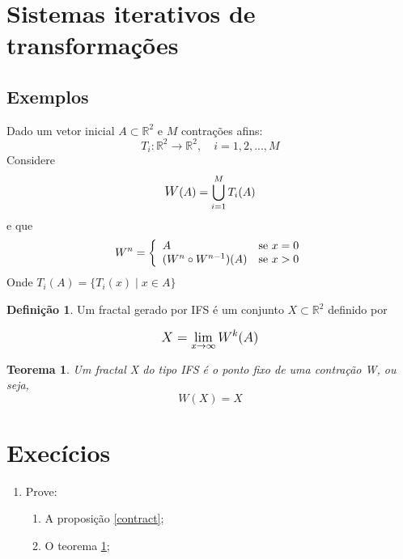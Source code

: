 \documentclass[12pt]{report}
\newtheorem{theorem}{Teorema}
\theoremstyle{definition}
\newtheorem{definition}{Definição}
\begin{document}
\section{Sistemas iterativos de transformações}

\subsection{Exemplos}

Dado um vetor inicial \( A \subset \mathbb{R}^2 \) e \( M \) contrações afins:
\[ 
    T_i: \mathbb{R}^2 \longrightarrow \mathbb{R}^2, \quad i = 1,2,...,M 
\]
Considere
\begin{equation}
    \mathlarger W(A) = \bigcup_{i = 1}^{M} T_i(A)
\end{equation}
e que
\begin{equation}
    W^n =
    \left\{
    	\begin{array}{l l}
    		 A                         & \mbox{se } x = 0 \\
    		 (W^{n} \circ W^{n-1})(A)  & \mbox{se } x > 0
    	\end{array}
    \right.
\end{equation}
Onde \( T_i(A) = \{ T_i(x) \mid x \in A \} \)
\begin{definition}

Um fractal gerado por IFS é um conjunto \( X \subset  \mathbb{R}^2 \) definido por 

\[ 
    \mathlarger{
        X = \lim_{x \rightarrow{\infty}} W^k(A)
    }  
\]

\end{definition}

\begin{theorem}\label{idenpotent}
Um fractal X do tipo IFS é o ponto fixo de uma contração W, ou seja,
\[ 
    W(X) = X 
\] 

\end{theorem}

\section{Execícios}

\begin{enumerate}
    \item Prove:
        \begin{enumerate}
            \item A proposição \ref{contract};
            \item O teorema \ref{idenpotent};
        \end{enumerate}
    
\end{enumerate}
\end{document}
